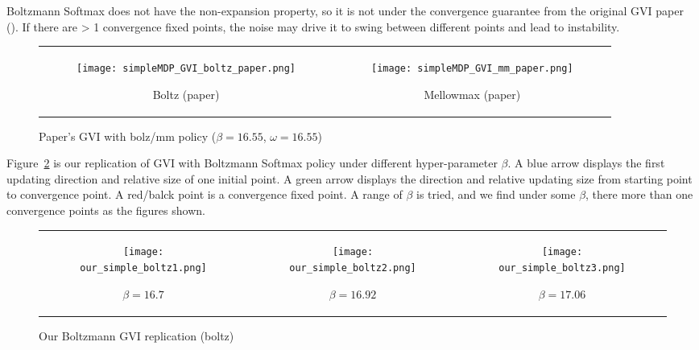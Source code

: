 Boltzmann Softmax does not have the non-expansion property, 
so it is not under the convergence guarantee from the original GVI paper (\cite{littman1996generalized}). 
If there are > 1 convergence fixed points, the noise may drive it to swing 
between different points and lead to instability.

{\centering
\begin{figure}[H]
\begin{tabular}{cc}
\begin{subfigure}{0.45\textwidth}\centering\texttt{[image: simpleMDP\_GVI\_boltz\_paper.png]}\caption{Boltz (paper)}\end{subfigure}&
\begin{subfigure}{0.45\textwidth}\centering\texttt{[image: simpleMDP\_GVI\_mm\_paper.png]}\caption{Mellowmax (paper)}\end{subfigure}\\
\end{tabular}
\caption{Paper's GVI with bolz/mm policy ($\beta=16.55$, $\omega=16.55$)}\label{fig:simple_mdp_gvi_paper}
\end{figure}}


Figure\ \ref{fig:simple_mdp_gvi_our_bolz} is our replication of GVI with Boltzmann Softmax policy under different hyper-parameter $\beta$.
A blue arrow displays the first updating direction and relative size  of one initial point.
A green arrow displays the direction and relative updating size from starting point to convergence point.
A red/balck point is a convergence fixed point.
A range of $\beta$ is tried, and we find under some $\beta$, there more than one convergence points as the figures shown.

{\centering
\begin{figure}[H]
\begin{tabular}{ccc}
\begin{subfigure}{0.33\textwidth}\centering\texttt{[image: our\_simple\_boltz1.png]}\caption{$\beta=16.7$}\end{subfigure}&
\begin{subfigure}{0.33\textwidth}\centering\texttt{[image: our\_simple\_boltz2.png]}\caption{$\beta=16.92$}\end{subfigure}&
\begin{subfigure}{0.33\textwidth}\centering\texttt{[image: our\_simple\_boltz3.png]}\caption{$\beta=17.06$}\end{subfigure}\\
\end{tabular}
\caption{Our Boltzmann GVI replication (boltz)}\label{fig:simple_mdp_gvi_our_bolz}
\end{figure}}

